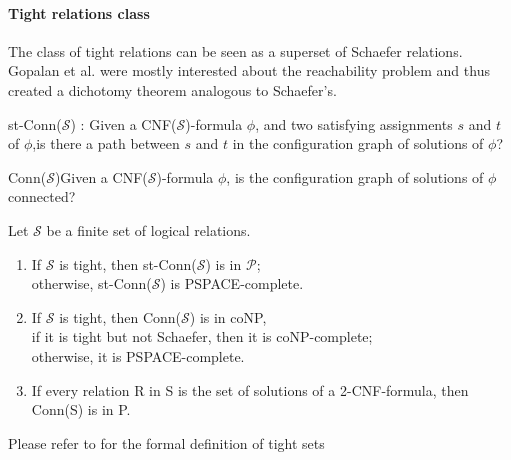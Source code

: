 \paragraph{Tight relations class\cite{gopalan_connectivity_2006}}
The class of tight relations can be seen as a superset of Schaefer relations. Gopalan et al. were mostly interested about the reachability problem and thus created a dichotomy theorem analogous to Schaefer's.  

\begin{defn}
st-Conn($\mathcal{S}$) : Given a CNF($\mathcal{S}$)-formula $\phi$, and two satisfying assignments $s$ and $t$ of $\phi$,is there a path between $s$ and $t$ in the configuration graph of solutions of $\phi$?
\end{defn}

\begin{defn}
Conn($\mathcal{S}$)Given a CNF($\mathcal{S}$)-formula $\phi$, is the configuration graph of solutions of $\phi$ connected?
\end{defn}

\begin{theorem} \cite{DBLP:journals/corr/Heuvel13}
Let $\mathcal{S}$ be a finite set of logical relations.
\begin{enumerate}
    \item If $\mathcal{S}$ is tight, then st-Conn($\mathcal{S}$) is in $\mathcal{P}$; \\otherwise, st-Conn($\mathcal{S}$) is PSPACE-complete. 
    \item If $\mathcal{S}$ is tight, then Conn($\mathcal{S}$) is in coNP, \\if it is tight but not Schaefer, then it is coNP-complete; \\otherwise, it is PSPACE-complete.
    \item If every relation R in S is the set of solutions of a 2-CNF-formula, then
Conn(S) is in P.
\end{enumerate}
\end{theorem}

\begin{footnotesize}
Please refer to \cite{gopalan_connectivity_2006} for the formal definition of tight sets 
\end{footnotesize}


